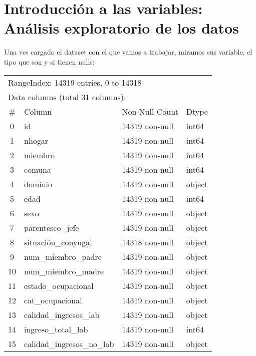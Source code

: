 \documentclass[a4paper]{article}
\begin{document}
\newpage

\section{Introducción a las variables: Análisis exploratorio de los datos}
 
    Una ves cargado el dataset con el que vamos a trabajar, miramos sus variable, el tipo que son y si tienen nulls:
    \begin{table}[H]\begin{center}
    \begin{tabular}{clll}
    \multicolumn{4}{l}{RangeIndex: 14319 entries, 0 to 14318} \\
    \multicolumn{4}{l}{Data columns (total 31 columns):}  \\
    \#  & Column                     & Non-Null Count & Dtype \\ \hline
    0  & id                          & 14319 non-null & int64 \\
    1  & nhogar                      & 14319 non-null & int64 \\
    2  & miembro                     & 14319 non-null & int64 \\
    3  & comuna                      & 14319 non-null & int64 \\
    4  & dominio                     & 14319 non-null & object \\
    5  & edad                        & 14319 non-null & int64 \\
    6  & sexo                        & 14319 non-null & object \\
    7  & parentesco\_jefe             & 14319 non-null & object \\
    8  & situación\_conyugal          & 14318 non-null & object \\
    9  & num\_miembro\_padre           & 14319 non-null & object \\
    10 & num\_miembro\_madre           & 14319 non-null & object \\
    11 & estado\_ocupacional          & 14319 non-null & object \\
    12 & cat\_ocupacional             & 14319 non-null & object \\
    13 & calidad\_ingresos\_lab        & 14319 non-null & object \\
    14 & ingreso\_total\_lab           & 14319 non-null & int64  \\
    15 & calidad\_ingresos\_no\_lab     & 14319 non-null & object \\

\end{tabular}
\end{center}
\end{table}
\end{document}
